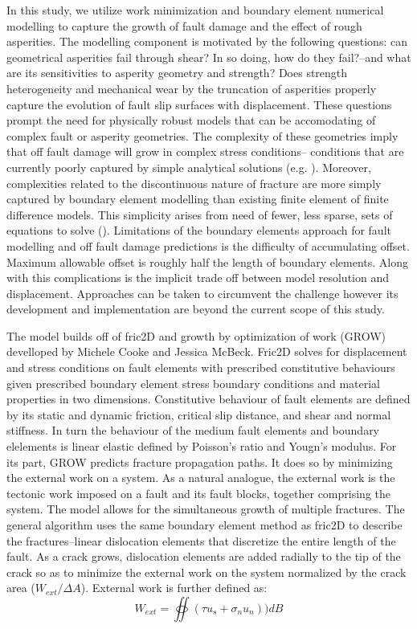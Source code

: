 \documentclass[12pt,a4paper]{article}
\begin{document}
	In this study, we utilize work minimization and boundary element numerical modelling to capture the growth of fault damage and the effect of rough asperities. The modelling component is motivated by the following questions: can geometrical asperities fail through shear? In so doing, how do they fail?--and what are its sensitivities to asperity geometry and strength? Does strength heterogeneity and mechanical wear by the truncation of asperities properly capture the evolution of fault slip surfaces with displacement. These questions prompt the need for physically robust models that can be accomodating of complex fault or asperity geometries. The complexity of these geometries imply that off fault damage will grow in complex stress conditions-- conditions that are currently poorly captured by simple analytical solutions (e.g. \cite{chester2000stress}). Moreover, complexities related to the discontinuous nature of fracture are more simply captured by boundary element modelling than existing finite element of finite difference models. This simplicity arises from need of fewer, less sparse, sets of equations to solve (\cite{crouch1982boundary}). Limitations of the boundary elements approach for fault modelling and off fault damage predictions is the difficulty of accumulating offset. Maximum allowable offset is roughly half the length of boundary elements. Along with this complications is the implicit trade off between model resolution and displacement. Approaches can be taken to circumvent the challenge however its development and implementation are beyond the current scope of this study. 
	
	The model builds off of fric2D and growth by optimization of work (GROW) develloped by Michele Cooke and Jessica McBeck. Fric2D solves for displacement and stress conditions on fault elements with prescribed constitutive behaviours given prescribed boundary element stress boundary conditions and material properties in two dimensions. Constitutive behaviour of fault elements are defined by its static and dynamic friction, critical slip distance, and shear and normal stiffness. In turn the behaviour of the medium fault elements and boundary elelements is linear elastic defined by Poisson's ratio and Yougn's modulus. For its part, GROW predicts fracture propagation paths. It does so by minimizing the external work on a system. As a natural analogue, the external work is the tectonic work imposed on a fault and its fault blocks, together comprising the system. The model allows for the simultaneous growth of multiple fractures. The general algorithm uses the same boundary element method as fric2D to describe the fractures--linear dislocation elements that discretize the entire length of the fault. As a crack grows, dislocation elements are added radially to the tip of the crack so as to minimize the external work on the system normalized by the crack area ($W_{ext}/\Delta A$). External work is further defined as:
		\begin{equation}
		W_{ext} = \oiint (\tau u_s + \sigma_n u_n))dB
		\end{equation}
		
\end{document}

